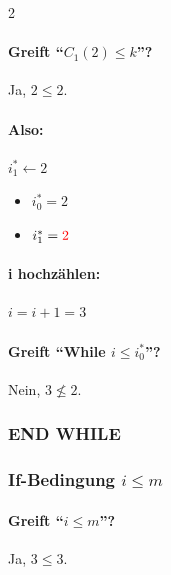 \begin{multicols}{2}
    \paragraph{Greift ``$C_1(2)\le k$''?} Ja, $2 \le 2$.
    \paragraph{Also:} $i_1^\ast \gets 2$
    \columnbreak
    \begin{itemize}
        \item $i_0^\ast = 2$
        \item $i_1^\ast = \textcolor{red}{2} $
    \end{itemize}
\end{multicols}

\paragraph{i hochzählen:} $i = i + 1 = 3$

\paragraph{Greift ``While $i \le i_{0}^\ast$''?} Nein, $3 \not\le 2$.

\subsubsection*{END WHILE}

\newpage

\subsubsection*{If-Bedingung $i\le m$}

\paragraph{Greift ``$i\le m$''?} Ja, $3 \leq 3$.

